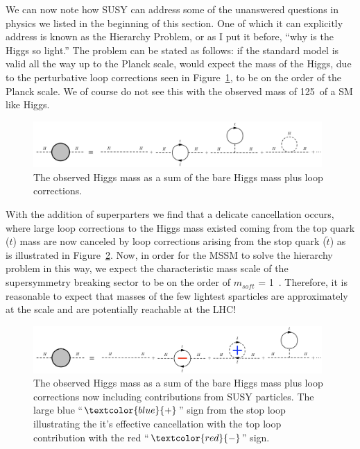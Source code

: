 We can now note how SUSY can address some of the unanswered questions in physics we listed in the beginning of this section.
One of which it can explicitly address is known as the Hierarchy Problem, or as I put it before, ``why is the Higgs so light.''
The problem can be stated as follows: if the standard model is valid all the way up to the Planck scale, would expect the mass of the Higgs, due to the perturbative loop corrections seen in Figure~\ref{fig:theory:HiggsMassLoops}, to be on the order of the Planck scale.
We of course do not see this with the observed mass of 125~\GeV of a SM like Higgs.
\begin{figure}[ht]
  \begin{center}
    \includegraphics[width=0.98\textwidth]{figs/theory/HiigsMassLoops.png}
  \end{center}
  \caption{The observed Higgs mass as a sum of the bare Higgs mass plus loop corrections.}
  \label{fig:theory:HiggsMassLoops}
\end{figure}
With the addition of superparters we find that a delicate cancellation occurs, where large loop corrections to the Higgs mass existed coming from the top quark ($t$) mass are now canceled by loop corrections arising from the stop quark ($\tilde t$) as is illustrated in Figure~\ref{fig:theory:HiggsMassLoopsSUSY}.
Now, in order for the MSSM to solve the hierarchy problem in this way, we expect the characteristic mass scale of the supersymmetry breaking sector to be on the order of $m_{soft}$ = 1~\TeV.
Therefore, it is reasonable to expect that masses of the few lightest sparticles are approximately at the \TeV scale and are potentially reachable at the LHC!
\begin{figure}[ht]
  \begin{center}
    \includegraphics[width=0.98\textwidth]{figs/theory/HiigsMassLoopsSUSY.png}
  \end{center}
  \caption{The observed Higgs mass as a sum of the bare Higgs mass plus loop corrections now including contributions from SUSY particles. The large blue ``$\textcolor{blue}{+}$'' sign from the stop loop illustrating the it's effective cancellation with the top loop contribution with the red ``$\textcolor{red}{-}$'' sign.}
  \label{fig:theory:HiggsMassLoopsSUSY}
\end{figure}

